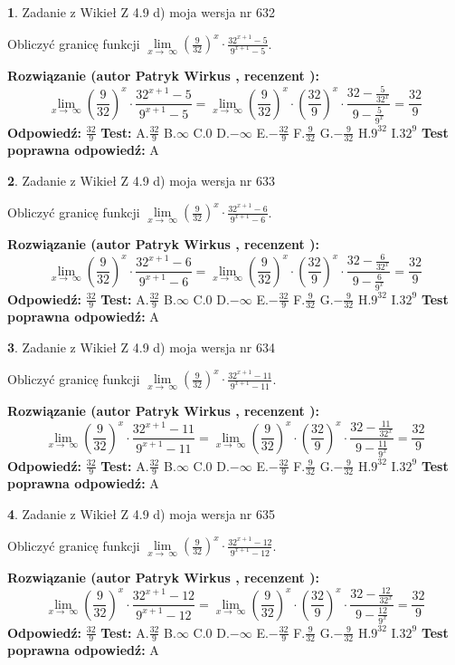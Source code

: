 \documentclass[12pt, a4paper]{article}
\theoremstyle{definition} %
\newtheorem{zad}{}
\newcommand{\zadStart}[1]{\begin{zad}#1\newline}
\newcommand{\zadStop}{\end{zad}}
\newcommand{\rozwStart}[2]{\noindent \textbf{Rozwiązanie (autor #1 , recenzent #2): }\newline}
\newcommand{\rozwStop}{\newline}
\newcommand{\odpStart}{\noindent \textbf{Odpowiedź:}\newline}
\newcommand{\odpStop}{\newline}
\newcommand{\testStart}{\noindent \textbf{Test:}\newline}
\newcommand{\testStop}{\newline}
\newcommand{\kluczStart}{\noindent \textbf{Test poprawna odpowiedź:}\newline}
\newcommand{\kluczStop}{\newline}
\begin{document}
\zadStart{Zadanie z Wikieł Z 4.9 d) moja wersja nr 632}


Obliczyć granicę funkcji  $\lim\limits_{x\to\ \infty}(\frac{9}{32})^{x}\cdot\frac{32^{x+1}-5}{9^{x+1}-5}$.
\zadStop
\rozwStart{Patryk Wirkus}{}
$$\lim\limits_{x\to\ \infty}(\frac{9}{32})^{x}\cdot\frac{32^{x+1}-5}{9^{x+1}-5}=\lim\limits_{x\to\ \infty}(\frac{9}{32})^{x}\cdot(\frac{32}{9})^{x} \cdot \frac{32-\frac{5}{32^{x}}}{9-\frac{5}{9^{x}}} = \frac{32}{9}$$
\rozwStop
\odpStart
$\frac{32}{9}$
\odpStop
\testStart
A.$\frac{32}{9}$ B.$\infty$ C.$0$ D.$-\infty$ E.$-\frac{32}{9}$
F.$\frac{9}{32}$ G.$-\frac{9}{32}$
H.$9^{32}$
I.$32^{9}$
\testStop
\kluczStart
A
\kluczStop



\zadStart{Zadanie z Wikieł Z 4.9 d) moja wersja nr 633}


Obliczyć granicę funkcji  $\lim\limits_{x\to\ \infty}(\frac{9}{32})^{x}\cdot\frac{32^{x+1}-6}{9^{x+1}-6}$.
\zadStop
\rozwStart{Patryk Wirkus}{}
$$\lim\limits_{x\to\ \infty}(\frac{9}{32})^{x}\cdot\frac{32^{x+1}-6}{9^{x+1}-6}=\lim\limits_{x\to\ \infty}(\frac{9}{32})^{x}\cdot(\frac{32}{9})^{x} \cdot \frac{32-\frac{6}{32^{x}}}{9-\frac{6}{9^{x}}} = \frac{32}{9}$$
\rozwStop
\odpStart
$\frac{32}{9}$
\odpStop
\testStart
A.$\frac{32}{9}$ B.$\infty$ C.$0$ D.$-\infty$ E.$-\frac{32}{9}$
F.$\frac{9}{32}$ G.$-\frac{9}{32}$
H.$9^{32}$
I.$32^{9}$
\testStop
\kluczStart
A
\kluczStop



\zadStart{Zadanie z Wikieł Z 4.9 d) moja wersja nr 634}


Obliczyć granicę funkcji  $\lim\limits_{x\to\ \infty}(\frac{9}{32})^{x}\cdot\frac{32^{x+1}-11}{9^{x+1}-11}$.
\zadStop
\rozwStart{Patryk Wirkus}{}
$$\lim\limits_{x\to\ \infty}(\frac{9}{32})^{x}\cdot\frac{32^{x+1}-11}{9^{x+1}-11}=\lim\limits_{x\to\ \infty}(\frac{9}{32})^{x}\cdot(\frac{32}{9})^{x} \cdot \frac{32-\frac{11}{32^{x}}}{9-\frac{11}{9^{x}}} = \frac{32}{9}$$
\rozwStop
\odpStart
$\frac{32}{9}$
\odpStop
\testStart
A.$\frac{32}{9}$ B.$\infty$ C.$0$ D.$-\infty$ E.$-\frac{32}{9}$
F.$\frac{9}{32}$ G.$-\frac{9}{32}$
H.$9^{32}$
I.$32^{9}$
\testStop
\kluczStart
A
\kluczStop



\zadStart{Zadanie z Wikieł Z 4.9 d) moja wersja nr 635}


Obliczyć granicę funkcji  $\lim\limits_{x\to\ \infty}(\frac{9}{32})^{x}\cdot\frac{32^{x+1}-12}{9^{x+1}-12}$.
\zadStop
\rozwStart{Patryk Wirkus}{}
$$\lim\limits_{x\to\ \infty}(\frac{9}{32})^{x}\cdot\frac{32^{x+1}-12}{9^{x+1}-12}=\lim\limits_{x\to\ \infty}(\frac{9}{32})^{x}\cdot(\frac{32}{9})^{x} \cdot \frac{32-\frac{12}{32^{x}}}{9-\frac{12}{9^{x}}} = \frac{32}{9}$$
\rozwStop
\odpStart
$\frac{32}{9}$
\odpStop
\testStart
A.$\frac{32}{9}$ B.$\infty$ C.$0$ D.$-\infty$ E.$-\frac{32}{9}$
F.$\frac{9}{32}$ G.$-\frac{9}{32}$
H.$9^{32}$
I.$32^{9}$
\testStop
\kluczStart
A
\kluczStop
\end{document}
